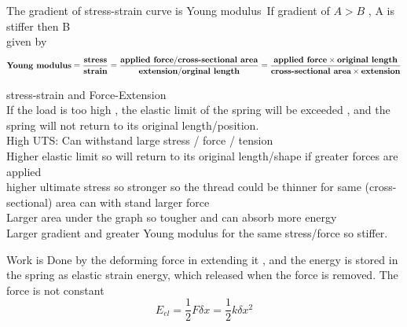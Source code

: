 \documentclass[a4paper]{article}
\begin{document}
\begin{defi}
The gradient of stress-strain curve is Young modulus\
If gradient of $A > B$ , A is stiffer then B\\
given by
\begin{equation*}
    \textbf{Young modulus}=\frac{\textbf{stress}}{\textbf{strain}}=\frac{\textbf{applied force}/\textbf{cross-sectional area}}{\textbf{extension}/\textbf{orginal length}}
    \\=\frac{\textbf{applied force}\times \textbf{original length}}{\textbf{cross-sectional area}\times \textbf{extension}}
\end{equation*}

\end{defi}
\begin{defi}[Graph]
stress-strain and Force-Extension\\

If the load is too high , the elastic limit of the spring will be exceeded , and the spring will not return to its original length/position.\\

High UTS: Can withstand large stress / force / tension\\

Higher elastic limit so will return to its original length/shape if greater forces are applied\\

higher ultimate stress so stronger so the thread could be thinner for same (cross-sectional) area can with stand larger force\\

Larger area under the graph so tougher and can absorb more energy\\

Larger gradient and greater Young modulus for the same stress/force so stiffer.
\end{defi}



\begin{defi}
Work is Done by the deforming force in extending it , and the energy is stored in the spring as elastic strain energy, which released when the force is removed. The force is not constant
\begin{equation*}
    E_{el}=\frac{1}{2}F\delta x=\frac{1}{2}k\delta x^2
\end{equation*}
\end{defi}
\end{document}
